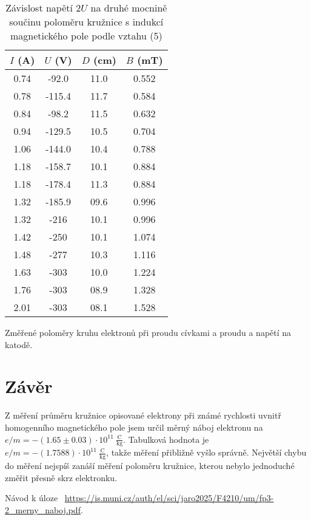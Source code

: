 \documentclass[a4paper,11pt]{article}
\begin{document}
\begin{table}[htpb]
    \begin{minipage}{.45\linewidth}
        \centering
        \begin{tabular}{| c c c c |}
            \hline
            $ I $ (A) & $ U $  (V) & $ D $ (cm) & $ B $  (mT) \\
            \hline
            0.74 &  -92.0 & 11.0 & 0.552 \\
            0.78 & -115.4 & 11.7 & 0.584 \\
            0.84 &  -98.2 & 11.5 & 0.632 \\
            0.94 & -129.5 & 10.5 & 0.704 \\
            1.06 & -144.0 & 10.4 & 0.788 \\
            1.18 & -158.7 & 10.1 & 0.884 \\
            1.18 & -178.4 & 11.3 & 0.884 \\
            1.32 & -185.9 & 09.6 & 0.996 \\
            1.32 & -216   & 10.1 & 0.996 \\
            1.42 & -250   & 10.1 & 1.074 \\
            1.48 & -277   & 10.3 & 1.116 \\
            1.63 & -303   & 10.0 & 1.224 \\
            1.76 & -303   & 08.9 & 1.328 \\
            2.01 & -303   & 08.1 & 1.528 \\
            \hline
        \end{tabular}
        \caption{Změřené poloměry kruhu elektronů při proudu cívkami a proudu a napětí na katodě.}
    \end{minipage} 
    \hfill
    \begin{minipage}{.5\linewidth}
        \centering
        \resizebox{\textwidth}{!}{  }
        \captionsetup{type=graph}
        \caption{Závislost napětí $ 2U $ na druhé mocnině součinu poloměru kružnice s indukcí magnetického pole podle vztahu (5) }
    \end{minipage} 
\end{table}

\section{Závěr}

Z měření průměru kružnice opisované elektrony při známé rychlosti uvnitř homogenního magnetického pole jsem určil měrný náboj elektronu na $ e / m = -(1.65 \pm  0.03) \cdot 10^{11} \  \frac{\text{C}}{\text{kg}} $. Tabulková hodnota je $ e / m = -(1.7588) \cdot 10^{11} \  \frac{\text{C}}{\text{kg}} $,  takže měření přibližně vyšlo správně. Největší chybu do měření nejspíš zanáší měření poloměru kružnice, kterou nebylo jednoduché změřit přesně skrz elektronku.

\begin{thebibliography}{0}
 Návod k úloze ~\url{https://is.muni.cz/auth/el/sci/jaro2025/F4210/um/fp3-2_merny_naboj.pdf}.   
\end{thebibliography}
\end{document}
